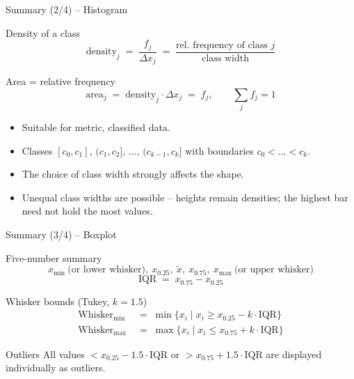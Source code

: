 \documentclass[aspectratio=169,11pt]{beamer}
\begin{document}
\begin{frame}{Summary (2/4) -- Histogram}
  \begin{block}{Density of a class}
    \[
      \text{density}_j \;=\; \frac{f_j}{\Delta x_j}
      \;=\; \frac{\text{rel.\ frequency of class } j}{\text{class width}}
    \]
  \end{block}
  \begin{block}{Area = relative frequency}
    \[
      \text{area}_j \;=\; \text{density}_j \cdot \Delta x_j \;=\; f_j,
      \qquad \sum_j f_j = 1
    \]
  \end{block}
  \begin{itemize}
    \item Suitable for metric, classified data.
    \item Classes $[c_0,c_1],\,(c_1,c_2],\,\ldots,\,(c_{k-1},c_k]$ with
          boundaries $c_0 < \ldots < c_k$.
    \item The choice of class width strongly affects the shape.
    \item Unequal class widths are possible -- heights remain densities; the
          highest bar need not hold the most values.
  \end{itemize}
\end{frame}

\begin{frame}{Summary (3/4) -- Boxplot}
  \begin{block}{Five-number summary}
    \[
      x_{\min}\ \text{(or lower whisker)},\ x_{0.25},\ \tilde{x},\ x_{0.75},\ x_{\max}\ \text{(or upper whisker)}
    \]
    \[
      \text{IQR} \;=\; x_{0.75} - x_{0.25}
    \]
  \end{block}
  \begin{block}{Whisker bounds (Tukey, $k = 1.5$)}
    \begin{align*}
      \text{Whisker}_{\min} &\;=\; \min\!\bigl\{x_i \mid x_i \geq x_{0.25} - k \cdot \text{IQR}\bigr\} \\
      \text{Whisker}_{\max} &\;=\; \max\!\bigl\{x_i \mid x_i \leq x_{0.75} + k \cdot \text{IQR}\bigr\}
    \end{align*}
  \end{block}
  \begin{alertblock}{Outliers}
    All values $< x_{0.25} - 1.5 \cdot \text{IQR}$ or $> x_{0.75} + 1.5 \cdot \text{IQR}$
    are displayed individually as outliers.
  \end{alertblock}
\end{frame}
\end{document}
